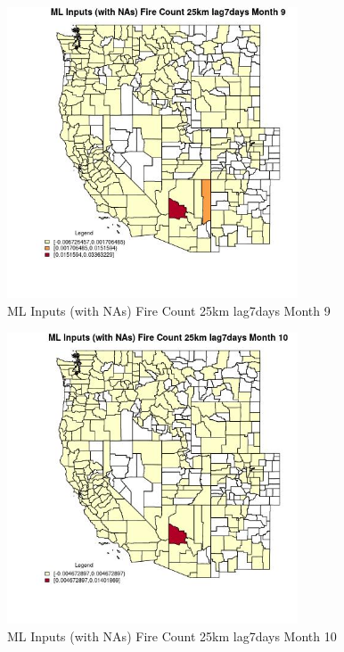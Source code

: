 \begin{figure} 
\centering  
\includegraphics[width=0.77\textwidth]{Code_Outputs/Report_ML_input_PM25_Step4_part_e_de_duplicated_aves_compiled_2019-05-21wNAs_CountyFire_Count_25km_lag7daysmedianMonth9.jpg} 
\caption{\label{fig:Report_ML_input_PM25_Step4_part_e_de_duplicated_aves_compiled_2019-05-21wNAsCountyFire_Count_25km_lag7daysmedianMonth9}ML Inputs (with NAs) Fire Count 25km lag7days Month 9} 
\end{figure} 
 

\begin{figure} 
\centering  
\includegraphics[width=0.77\textwidth]{Code_Outputs/Report_ML_input_PM25_Step4_part_e_de_duplicated_aves_compiled_2019-05-21wNAs_CountyFire_Count_25km_lag7daysmedianMonth10.jpg} 
\caption{\label{fig:Report_ML_input_PM25_Step4_part_e_de_duplicated_aves_compiled_2019-05-21wNAsCountyFire_Count_25km_lag7daysmedianMonth10}ML Inputs (with NAs) Fire Count 25km lag7days Month 10} 
\end{figure} 
 

